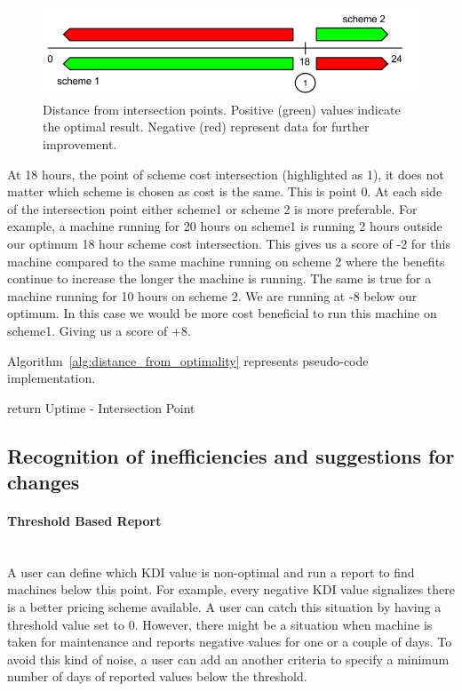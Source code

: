 \documentclass[]{final_report}
\newcommand{\myparagraph}[1]{\paragraph{#1}\mbox{}\\}
\begin{document}
\begin{figure}[H]
       \includegraphics[width=\linewidth]{figures/distance}
      \caption{Distance from intersection points. Positive (green) values indicate the optimal result. Negative (red) represent data for further improvement.}
        \label{fig:distance}
\end{figure}

At 18 hours, the point of scheme cost intersection (highlighted as 1), it does not matter which scheme is chosen as cost is the same. This is point 0.
At each side of the intersection point either scheme1 or scheme 2 is more preferable.
For example, a machine running for 20 hours on scheme1 is running 2 hours outside our optimum 18 hour scheme cost intersection. This gives us a score of -2 for this machine compared to the same machine running on scheme 2 where the benefits continue to increase the longer the machine is running.
The same is true for a machine running for 10 hours on scheme 2. We are running at -8 below our optimum. In this case we would be more cost beneficial to run this machine on scheme1. Giving us a score of +8.

Algorithm~\ref{alg:distance_from_optimality} represents pseudo-code implementation.


\begin{algorithm}[H]
 \label{alg:distance_from_optimality}
   {
        return Uptime - Intersection Point
  } 
\caption{Uptime Based Distance From Intersection Points}
\end{algorithm}

\subsection{Recognition of inefficiencies and suggestions for changes}

\myparagraph{Threshold Based Report}

A user can define which KDI value is non-optimal and run a report to find machines below this point. For example, every negative KDI value signalizes there is a better pricing scheme available. A user can catch this situation by having a threshold value set to 0. However, there might be a situation when machine is taken for maintenance and reports negative values for one or a couple of days. To avoid this kind of noise, a user can add an another criteria to specify a minimum number of days of reported values below the threshold.
\end{document}
